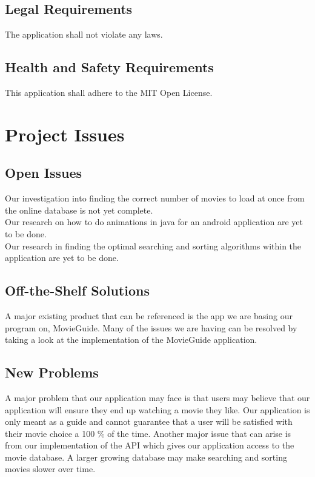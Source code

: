 \documentclass[12pt, titlepage]{article}
\begin{document}
\subsection{Legal Requirements}

The application shall not violate any laws.

\subsection{Health and Safety Requirements}

This application shall adhere to the MIT Open License.


\section{Project Issues}

\subsection{Open Issues}

Our investigation into finding the correct number of movies to load at once from the online database is not yet complete.\\

Our research on how to do animations in java for an android application are yet to be done.\\

Our research in finding the optimal searching and sorting algorithms within the application are yet to be done.\\

\subsection{Off-the-Shelf Solutions}

A major existing product that can be referenced is the app we are basing our program on, MovieGuide. Many of the issues we are having can be resolved by taking a look at the implementation of the MovieGuide application.

\subsection{New Problems}

A major problem that our application may face is that users may believe that our application will ensure they end up watching a movie they like. Our application is only meant as a guide and cannot guarantee that a user will be satisfied with their movie choice a 100 \% of the time. Another major issue that can arise is from our implementation of the API which gives our application access to the movie database. A larger growing database may make searching and sorting movies slower over time. 
\end{document}
